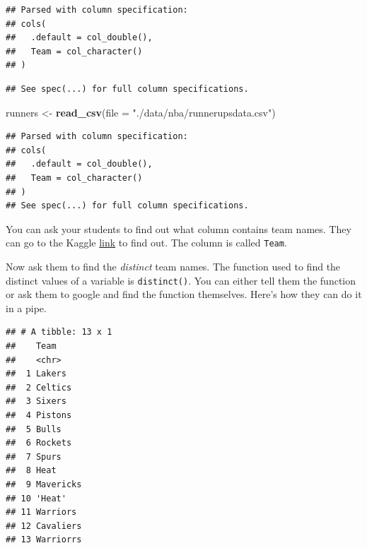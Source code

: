 \documentclass[]{book}
\newenvironment{Shaded}{\begin{snugshade}}{\end{snugshade}}
\newcommand{\CommentTok}[1]{\textcolor[rgb]{0.56,0.35,0.01}{\textit{#1}}}
\newcommand{\DataTypeTok}[1]{\textcolor[rgb]{0.13,0.29,0.53}{#1}}
\newcommand{\KeywordTok}[1]{\textcolor[rgb]{0.13,0.29,0.53}{\textbf{#1}}}
\newcommand{\NormalTok}[1]{#1}
\newcommand{\OperatorTok}[1]{\textcolor[rgb]{0.81,0.36,0.00}{\textbf{#1}}}
\newcommand{\StringTok}[1]{\textcolor[rgb]{0.31,0.60,0.02}{#1}}
\begin{document}
\begin{verbatim}
## Parsed with column specification:
## cols(
##   .default = col_double(),
##   Team = col_character()
## )
\end{verbatim}

\begin{verbatim}
## See spec(...) for full column specifications.
\end{verbatim}

\begin{Shaded}
\begin{Highlighting}[]
\NormalTok{runners <-}\StringTok{ }\KeywordTok{read_csv}\NormalTok{(}\DataTypeTok{file =} \StringTok{"./data/nba/runnerupsdata.csv"}\NormalTok{)}
\end{Highlighting}
\end{Shaded}

\begin{verbatim}
## Parsed with column specification:
## cols(
##   .default = col_double(),
##   Team = col_character()
## )
## See spec(...) for full column specifications.
\end{verbatim}

You can ask your students to find out what column contains team names. They can go to the Kaggle \href{https://www.kaggle.com/daverosenman/nba-finals-team-stats}{link} to find out. The column is called \texttt{Team}.

Now ask them to find the \emph{distinct} team names. The function used to find the distinct values of a variable is \texttt{distinct()}. You can either tell them the function or ask them to google and find the function themselves. Here's how they can do it in a pipe.

\begin{Shaded}
\end{Shaded}

\begin{verbatim}
## # A tibble: 13 x 1
##    Team     
##    <chr>    
##  1 Lakers   
##  2 Celtics  
##  3 Sixers   
##  4 Pistons  
##  5 Bulls    
##  6 Rockets  
##  7 Spurs    
##  8 Heat     
##  9 Mavericks
## 10 'Heat'   
## 11 Warriors 
## 12 Cavaliers
## 13 Warriorrs
\end{verbatim}
\end{document}
